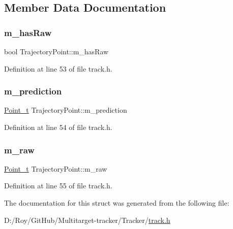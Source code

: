 \subsection{Member Data Documentation}
\mbox{\label{struct_trajectory_point_aedf0113745aff30b359a60401ddcf076}} 
\subsubsection{\texorpdfstring{m\+\_\+has\+Raw}{m\_hasRaw}}
{\footnotesize\ttfamily bool Trajectory\+Point\+::m\+\_\+has\+Raw}



Definition at line 53 of file track.\+h.

\mbox{\label{struct_trajectory_point_a967909b451c226e4927a2b96fcecbb6e}} 
\subsubsection{\texorpdfstring{m\+\_\+prediction}{m\_prediction}}
{\footnotesize\ttfamily \mbox{\hyperlink{defines_8h_a8c42696da8f098b91374a8e8bb84b430}{Point\+\_\+t}} Trajectory\+Point\+::m\+\_\+prediction}



Definition at line 54 of file track.\+h.

\mbox{\label{struct_trajectory_point_abb88f38dcc0abe8f428421a9fbf6a839}} 
\subsubsection{\texorpdfstring{m\+\_\+raw}{m\_raw}}
{\footnotesize\ttfamily \mbox{\hyperlink{defines_8h_a8c42696da8f098b91374a8e8bb84b430}{Point\+\_\+t}} Trajectory\+Point\+::m\+\_\+raw}



Definition at line 55 of file track.\+h.



The documentation for this struct was generated from the following file\+:\begin{DoxyCompactItemize}
\item 
D\+:/\+Roy/\+Git\+Hub/\+Multitarget-\/tracker/\+Tracker/\mbox{\hyperlink{track_8h}{track.\+h}}\end{DoxyCompactItemize}
